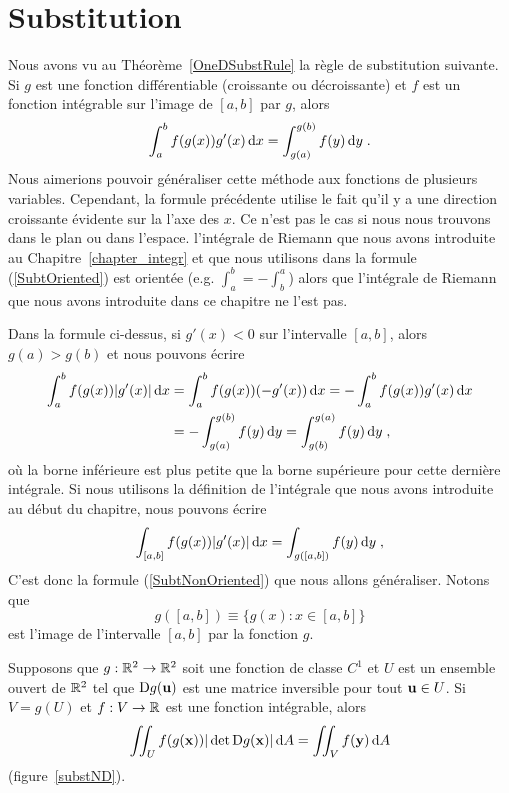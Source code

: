 {\section{Substitution}

Nous avons vu au Théorème~\ref{OneDSubstRule} la règle de substitution
suivante.  Si $g$ est une fonction différentiable (croissante ou
décroissante) et $f$ est un fonction intégrable sur l'image de $[a,b]$
par $g$, alors
\begin{equation}\label{SubtOriented}
\int_a^b f(g(x))g'(x)  \,\mathrm{d}x = \int_{g(a)}^{g(b)} f(y) \,\mathrm{d}y \; .
\end{equation}
Nous aimerions pouvoir généraliser cette méthode aux fonctions de
plusieurs variables.  Cependant, la formule précédente utilise le fait
qu'il y a une direction croissante évidente sur la l'axe des $x$.  Ce
n'est pas le cas si nous nous trouvons dans le plan ou dans l'espace.
l'intégrale de Riemann que nous avons introduite au
Chapitre~\ref{chapter_integr} et que nous utilisons dans la formule
(\ref{SubtOriented}) est orientée
(e.g. $\displaystyle \int_a^b = - \int_b^a$) alors que l'intégrale de
Riemann que nous avons introduite dans ce chapitre ne l'est pas.

Dans la formule ci-dessus, si $g'(x) < 0$ sur l'intervalle $[a,b]$,
alors $g(a) > g(b)$ et nous pouvons écrire
\begin{align*}
\int_a^b f(g(x)) |g'(x)|  \,\mathrm{d}x &=
\int_a^b f(g(x)) (-g'(x))  \,\mathrm{d}x = - \int_a^b f(g(x)) g'(x)  \,\mathrm{d}x \\
&= -\int_{g(a)}^{g(b)} f(y) \,\mathrm{d}y = \int_{g(b)}^{g(a)} f(y) \,\mathrm{d}y \; ,
\end{align*}
où la borne inférieure est plus petite que la borne supérieure pour
cette dernière intégrale.  Si nous utilisons la définition de
l'intégrale que nous avons introduite au début du chapitre, nous
pouvons écrire
\begin{equation}\label{SubtNonOriented}
  \int_{[a,b]} f(g(x)) |g'(x)|  \,\mathrm{d}x = \int_{g([a,b])} f(y) \,\mathrm{d}y \; ,
\end{equation}
C'est donc la formule (\ref{SubtNonOriented}) que nous allons
généraliser.   Notons que
\[
  g([a,b]) \equiv \{ g(x) : x \in [a,b] \}
\]
est l'image de l'intervalle $[a,b]$ par la fonction $g$.

\begin{theorem}
Supposons que $g:\mathbb{R}^2 \to \mathbb{R}^2$ soit une fonction de classe $C^1$ et
$U$ est un ensemble ouvert de $\mathbb{R}^2$ tel que $\mathrm{D} g(\mathbf{u})$ est
une matrice inversible pour tout $\mathbf{u} \in U$.  Si $V = g(U)$ et
$f:V \to \mathbb{R}$ est une fonction intégrable, alors
\[
  \iint_{U} f(g(\mathbf{x})) |\det \mathrm{D} g(\mathbf{x})| \,\mathrm{d}A =
  \iint_{V} f(\mathbf{y}) \,\mathrm{d}A
\]
(figure~\ref{substND}).
\label{NDSubstRule}
\end{theorem}

}
